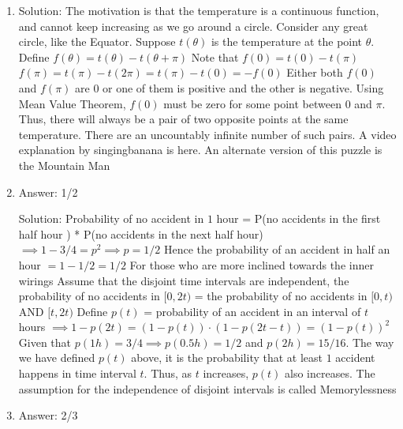 \begin{enumerate}
\item
Solution: The motivation is that the temperature is a continuous function, and cannot keep increasing as we go around a circle.
Consider any great circle, like the Equator.
Suppose $t(\theta)$ is the temperature at the point $\theta$.
Define $f(\theta) = t(\theta)-t(\theta+\pi)$
Note that $f(0)=t(0)-t(\pi)$
$f(\pi)=t(\pi)-t(2 \pi) = t(\pi)-t(0) = -f(0)$
Either both $f(0)$ and $f(\pi)$ are $0$ or one of them is positive and the other is negative.
Using Mean Value Theorem, $f(0)$ must be zero for some point between $0$ and $\pi$.
Thus, there will always be a pair of two opposite points at the same temperature.
There are an uncountably infinite number of such pairs.
A video explanation by singingbanana is here.
An alternate version of this puzzle is the Mountain Man




\item
Answer: 1/2
 
Solution: Probability of no accident in $1$ hour = P(no accidents in the first half hour ) * P(no accidents in the next half hour)
$\implies 1 - 3/4 =p^2 \implies p=1/2$
Hence the probability of an accident in half an hour $=1 - 1/2 = 1/2$
For those who are more inclined towards the inner wirings
Assume that the disjoint time intervals are independent, the probability of no accidents in $[0, 2t)$ = the probability of no accidents in $[0,t)$ AND $[t,2t)$
Define $p(t)$ = probability of an accident in an interval of $t$ hours
$\implies 1-p(2t) = (1-p(t)) \cdot (1-p(2t - t)) = (1 - p(t))^2$
Given that $p(1h)=3/4 \implies p(0.5h)=1/2$ and $p(2h)=15/16$.
The way we have defined $p(t)$ above, it is the probability that at least $1$ accident happens in time interval $t$. Thus, as $t$ increases, $p(t)$ also increases.
The assumption for the independence of disjoint intervals is called Memorylessness




\item
Answer: 2/3
 

\end{enumerate}

